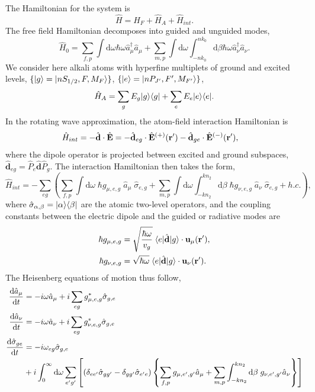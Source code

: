 \documentclass[preprint,aps,pra,onecolumn]{revtex4-1} %
\begin{document}
The Hamiltonian for the system is
\begin{equation}
\hat{H} = \hat{H}_F+\hat{H}_A + \hat{H}_{int}.
\end{equation}
The free field Hamiltonian decomposes into guided and unguided modes, 
\begin{equation}
\hat{H}_0 = \sum_{f,p}\int \mathrm{d}\omega \hbar \omega \hat{a}^\dagger_\mu \hat{a}_\mu 
+\sum_{m,p} \int \mathrm{d}\omega  \int_{-nk_0}^{nk_0} \mathrm{d}\beta \hbar \omega 
\hat{a}^\dagger_\nu \hat{a}_\nu.
\end{equation}
We consider here alkali atoms with hyperfine multiplets of ground and excited levels, $\{ 
\lvert{g}\rangle=\lvert{nS_{1/2}, F, M_F}\rangle\}$, $\{ \lvert{e}\rangle =\lvert{nP_{J'}, F', M_{F'}}\rangle\}$,
\begin{equation}
\hat{H}_A  = \sum_g E_g \lvert{g}\rangle\langle{g}\rvert + \sum_e E_e \lvert{e}\rangle\langle{e}\rvert.
\end{equation}
In the rotating wave approximation, the atom-field interaction Hamiltonian is
\begin{align}
\hat{H}_{int} &= -\hat{\mathbf{d}}\cdot \hat{\mathbf{E}} = -\hat{\mathbf{d}}_{eg}\cdot 
\hat{\mathbf{E}}^{(+)}(\mathbf{r}')-\hat{\mathbf{d}}_{ge}\cdot \hat{\mathbf{E}}^{(-)}(\mathbf{r}'),
\end{align}
where the dipole operator is projected between excited and ground subspaces, $\hat{\mathbf{d}}_{eg}= 
\hat{P}_e \hat{\mathbf{d}} \hat{P}_g $. The interaction Hamiltonian then takes the form, 
\begin{equation}
\hat{H}_{int} = -\sum_{eg} \left(\sum_{f,p} \int\mathrm{d}\omega \; \hbar g_{\mu, e,g}\; \hat{a}_\mu  \; 
\hat{\sigma}_{e,g}+ \sum_{m,p} \int\mathrm{d}\omega \int_{-kn_2}^{kn_2}\mathrm{d}\beta \;  \hbar 
g_{\nu, e,g}\; \hat{a}_\nu \; \hat{\sigma}_{e,g}+  h.c.\right),
\end{equation}
where $\hat{\sigma}_{\alpha,\beta}= \lvert{\alpha}\rangle\langle{\beta}\rvert$ are the atomic two-level operators, and 
the coupling constants between the electric dipole and the guided or radiative modes are
\begin{align}
\hbar g_{\mu, e,g} &= \sqrt{\frac{\hbar \omega}{v_g}}\; \langle{e}\rvert \hat{\mathbf{d}} \lvert{g}\rangle 
\cdot\mathbf{u}_\mu (\mathbf{r}'), \\
\hbar g_{\nu, e,g} &= \sqrt{\hbar \omega} \; \langle{e}\rvert \hat{\mathbf{d}} \lvert{g}\rangle \cdot \mathbf{u}_\nu (\mathbf{r}') .
\end{align}
The Heisenberg equations of motion thus follow,
\begin{align}
\frac{{\mathrm d} {\hat{a}_\mu}}{{\mathrm d}t} &= -i\omega \hat{a}_\mu +i\sum_{eg} g_{\mu, e,g}^* \hat{\sigma}_{g,e} \label{eq:da}\\
\frac{{\mathrm d} {\hat{a}_\nu}}{{\mathrm d}t} &= -i\omega \hat{a}_\nu +i\sum_{eg} g_{\nu, e,g}^*  \hat{\sigma}_{g,e} \label{eq:danu}\\
\frac{{\mathrm d} {\hat{\sigma}_{ge}}}{{\mathrm d}t} &= -i\omega_{eg} \hat{\sigma}_{g,e} \nonumber\\
&+ i\int_0^{\infty}\mathrm{d}\omega \sum_{e'g'} \left[ (\delta_{ee'} \hat{\sigma}_{gg'} - \delta_{gg'} 
\hat{\sigma}_{e'e}) \left\{ \sum_{f,p}  g_{\mu, e',g'}\hat{a}_\mu +\sum_{m,p}  
\int_{-kn_2}^{kn_2}\mathrm{d}\beta \; g_{\nu, e',g'} \hat{a}_\nu \right\}   \right]
 \label{eq:dsigma} 
\end{align}
\end{document}
